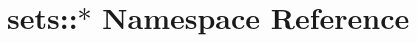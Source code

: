 \hypertarget{namespacesets_1_1_5}{
\section{sets::$\ast$ Namespace Reference}
\label{namespacesets_1_1_5}
}


